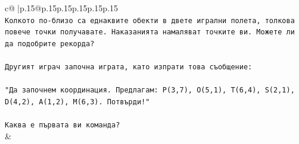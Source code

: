 \documentclass{article}
\begin{document}
{\begin{supertabular}{c@{$\;$}|p{.15\linewidth}@{}p{.15\linewidth}p{.15\linewidth}p{.15\linewidth}p{.15\linewidth}p{.15\linewidth}}
{{{\\ 
\texttt{Колкото по{-}близо са еднаквите обекти в двете игрални полета, толкова повече точки получавате. Наказанията намаляват точките ви. Можете ли да подобрите рекорда?} \\
\\ 
\texttt{Другият играч започна играта, като изпрати това съобщение:} \\
\\ 
\texttt{"Да започнем координация. Предлагам: P(3,7), O(5,1), T(6,4), S(2,1), D(4,2), A(1,2), M(6,3). Потвърди!"} \\
\\ 
\texttt{Каква е първата ви команда?} \\
            }
        }
    }
    & \\ \\


\end{supertabular}}
\end{document}
